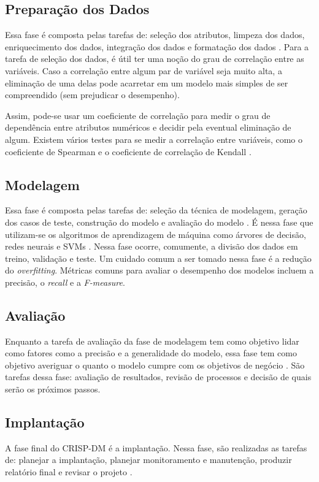 \subsection{Preparação dos Dados}
Essa fase é composta pelas tarefas de: seleção dos atributos, limpeza dos dados, 
enriquecimento dos dados, integração dos dados e formatação dos dados \cite{crispdm}.
Para a tarefa de seleção dos dados, é útil ter uma noção do grau de correlação entre
as variáveis.  Caso a correlação entre algum par de variável seja muito alta, a
eliminação de uma delas pode acarretar em um modelo mais simples de ser compreendido
(sem prejudicar o desempenho).
\par Assim, pode-se usar um coeficiente de correlação para medir o grau de dependência
entre atributos numéricos e decidir pela eventual eliminação de algum. Existem vários
testes para se medir a correlação entre variáveis, como o coeficiente de Spearman e o
coeficiente de correlação de Kendall \cite{kendall}. 

\subsection{Modelagem} 
Essa fase é composta pelas tarefas de: seleção da técnica de modelagem, geração dos
casos de teste, construção do modelo e avaliação do modelo \cite{crispdm}. É nessa
fase que utilizam-se os algoritmos de aprendizagem de máquina como árvores de decisão,
redes neurais e SVMs \cite{ml_second_book}. Nessa fase ocorre, comumente, a divisão
dos dados em treino, validação e teste. Um cuidado comum a ser tomado nessa fase é a
redução do \textit{overfitting}. Métricas comuns para avaliar o desempenho dos
modelos incluem a precisão, o \textit{recall} e a \textit{F-measure}.

\subsection{Avaliação} 
Enquanto a tarefa de avaliação da fase de modelagem tem como objetivo lidar como
fatores como a precisão e a generalidade do modelo, essa fase tem como objetivo
averiguar o quanto o modelo cumpre com os objetivos de negócio \cite{crispdm}. São
tarefas dessa fase: avaliação de resultados, revisão de processos e decisão de quais
serão os próximos passos.

\subsection{Implantação} 
A fase final do CRISP-DM é a implantação. Nessa fase, são realizadas as tarefas de:
planejar a implantação, planejar monitoramento e manutenção, produzir relatório final
e revisar o projeto \cite{crispdm}.

